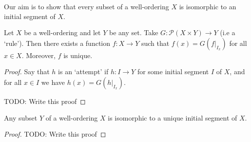 \documentclass[a4paper]{scrartcl}
\begin{document}
Our aim is to show that every subset of a well-ordering $X$ is isomorphic to an initial segment of $X$.

\begin{theorem}
Let $X$ be a well-ordering and let $Y$ be any set. Take $G: \mathcal{P}(X \times Y) \rightarrow Y$ (i.e a `rule'). Then there exists a function $f: X \rightarrow Y$ such that $f(x) = G\left(\left.f\right|_{I_x}\right)$ for all $x \in X$. Moreover, $f$ is unique.
\end{theorem}
\begin{proof}
Say that $h$ is an `attempt' if $h : I \rightarrow Y$ for some initial segment $I$ of $X$, and for all $x \in I$ we have $h(x) = G\left(\left.h\right|_{I_x}\right)$. 



{\color{red} TODO: Write this proof}
\end{proof}

\begin{proposition}
  Any subset $Y$ of a well-ordering $X$ is isomorphic to a unique initial segment of $X$.
\end{proposition}
\begin{proof}
  {\color{red} TODO: Write this proof}
\end{proof}
\end{document}
